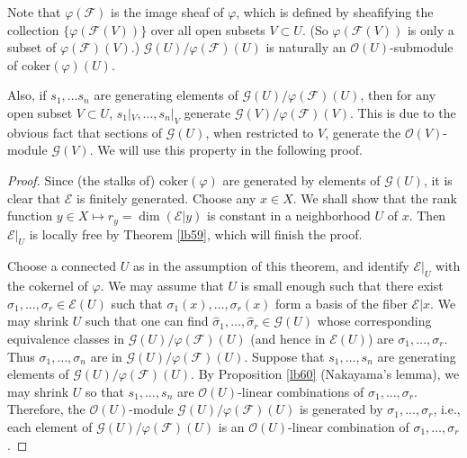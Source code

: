 \documentclass[12pt,a4paper,notitlepage]{report}
\theoremstyle{definition}
\theoremstyle{plain}
\newcommand{\wht}{\widehat}
\newcommand{\scr}{\mathscr}
\newcommand{\coker}{\mathrm{coker}}
\numberwithin{equation}{section}
\begin{document}
Note that  $\varphi(\scr F)$ is the image sheaf of $\varphi$, which is defined by sheafifying the collection $\{\varphi(\scr F(V))\}$ over all open subsets $V\subset U$. (So $\varphi(\scr F(V))$ is only a subset of $\varphi(\scr F)(V)$.) $\scr G(U)/\varphi(\scr F)(U)$ is naturally an $\scr O(U)$-submodule of $\coker(\varphi)(U)$.

Also, if $s_1,\dots s_n$ are generating elements of $\scr G(U)/\varphi(\scr F)(U)$, then for any open subset $V\subset U$, $s_1|_V,\dots,s_n|_V$ generate $\scr G(V)/\varphi(\scr F)(V)$. This is due to the obvious fact that sections of $\scr G(U)$, when restricted to $V$, generate the $\scr O(V)$-module $\scr G(V)$. We will use this property in the following proof.
 

\begin{proof}
Since (the stalks of) $\coker(\varphi)$ are generated by elements of $\scr G(U)$, it is clear that $\scr E$ is finitely generated. Choose any $x\in X$. We shall show that the rank function $y\in X\mapsto r_y=\dim(\scr E|y)$ is  constant in a neighborhood $U$ of $x$. Then $\scr E|_U$ is locally free by Theorem \ref{lb59}, which will finish the proof.

Choose a connected $U$ as in the assumption of this theorem, and identify $\scr E|_U$ with the cokernel of $\varphi$.   We may assume that $U$ is small enough such that there exist $\sigma_1,\dots,\sigma_r\in\scr E(U)$ such that $\sigma_1(x),\dots,\sigma_r(x)$ form a basis of the fiber $\scr E|x$. We may shrink $U$ such that one can find $\wht\sigma_1,\dots,\wht\sigma_r\in\scr G(U)$ whose corresponding equivalence classes in $\scr G(U)/\varphi(\scr F)(U)$ (and hence in $\scr E(U)$) are $\sigma_1,\dots,\sigma_r$. Thus $\sigma_1,\dots,\sigma_n$ are in $\scr G(U)/\varphi(\scr F)(U)$. Suppose that $s_1,\dots,s_n$ are generating elements of $\scr G(U)/\varphi(\scr F)(U)$. By Proposition \ref{lb60} (Nakayama's lemma), we may shrink $U$ so that $s_1,\dots,s_n$ are $\scr O(U)$-linear combinations of $\sigma_1,\dots,\sigma_r$. Therefore, the $\scr O(U)$-module $\scr G(U)/\varphi(\scr F)(U)$ is generated by $\sigma_1,\dots,\sigma_r$, i.e., each element of $\scr G(U)/\varphi(\scr F)(U)$ is an $\scr O(U)$-linear combination of $\sigma_1,\dots,\sigma_r$.


\end{proof}
\end{document}
